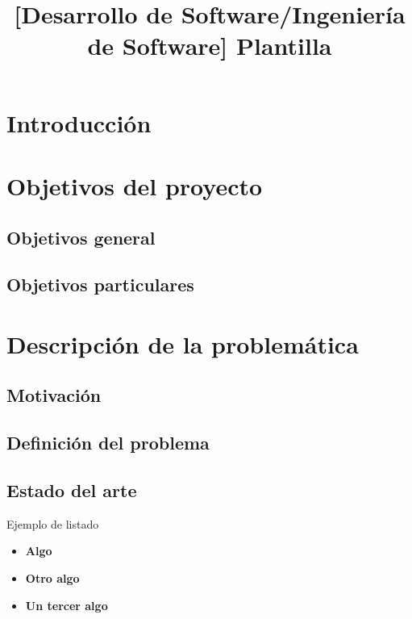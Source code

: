

\title{[Desarrollo de Software/Ingeniería de Software] Plantilla}


	
	
    \section{Introducción}
	
    \section{Objetivos del proyecto}
    
    \subsection{Objetivos general}
    
    \subsection{Objetivos particulares}

    \section{Descripción de la problemática}
       
    \subsection{Motivación}
    
    \subsection{Definición del problema}
        
    \subsection{Estado del arte}
   
      Ejemplo de listado
      \begin{itemize}
      \setlength\itemsep{0em}
      \item \textbf{Algo} \cite{c1}
      \item \textbf{Otro algo} \cite{c2}
      \item \textbf{Un tercer algo} \cite{c3}
      \end{itemize}
       
